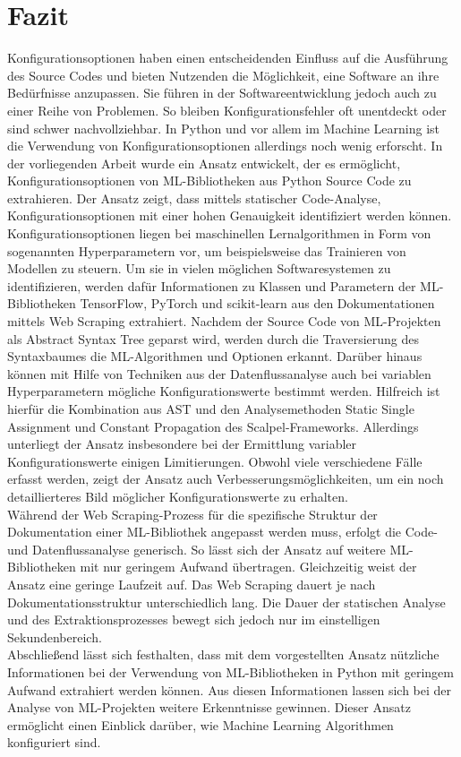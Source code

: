 \documentclass[german,bachelor]{swsLeipzig}
\begin{document}
\chapter{Fazit}\label{Fazit}
Konfigurationsoptionen haben einen entscheidenden Einfluss auf die Ausführung des Source Codes und bieten Nutzenden
die Möglichkeit, eine Software an ihre Bedürfnisse anzupassen.
Sie führen in der Softwareentwicklung jedoch auch zu einer Reihe von Problemen.
So bleiben Konfigurationsfehler oft unentdeckt oder sind schwer nachvollziehbar.
In Python und vor allem im Machine Learning ist die Verwendung von Konfigurationsoptionen allerdings noch wenig erforscht.
In der vorliegenden Arbeit wurde ein Ansatz entwickelt, der es ermöglicht, Konfigurationsoptionen von ML-Bibliotheken
aus Python Source Code zu extrahieren.
Der Ansatz zeigt, dass mittels statischer Code-Analyse, Konfigurationsoptionen mit einer hohen Genauigkeit identifiziert werden
können.\\
\indent Konfigurationsoptionen liegen bei maschinellen Lernalgorithmen in Form von sogenannten Hyperparametern vor, um beispielsweise
das Trainieren von Modellen zu steuern.
Um sie in vielen möglichen Softwaresystemen zu identifizieren, werden dafür Informationen zu Klassen und Parametern der
ML-Bibliotheken TensorFlow, PyTorch und scikit-learn aus den Dokumentationen mittels Web Scraping extrahiert.
Nachdem der Source Code von ML-Projekten als Abstract Syntax Tree geparst wird, werden durch die Traversierung des Syntaxbaumes
die ML-Algorithmen und Optionen erkannt.
Darüber hinaus können mit Hilfe von Techniken aus der Datenflussanalyse auch bei variablen Hyperparametern
mögliche Konfigurationswerte bestimmt werden.
Hilfreich ist hierfür die Kombination aus AST und den Analysemethoden Static Single Assignment und Constant Propagation
des Scalpel-Frameworks.
Allerdings unterliegt der Ansatz insbesondere bei der Ermittlung variabler Konfigurationswerte einigen Limitierungen.
Obwohl viele verschiedene Fälle erfasst werden, zeigt der Ansatz auch Verbesserungsmöglichkeiten, um ein noch
detaillierteres Bild möglicher Konfigurationswerte zu erhalten.\\
\indent Während der Web Scraping-Prozess für die spezifische Struktur der Dokumentation einer ML-Bibliothek angepasst werden muss,
erfolgt die Code- und Datenflussanalyse generisch.
So lässt sich der Ansatz auf weitere ML-Bibliotheken mit nur geringem Aufwand übertragen.
Gleichzeitig weist der Ansatz eine geringe Laufzeit auf.
Das Web Scraping dauert je nach Dokumentationsstruktur unterschiedlich lang.
Die Dauer der statischen Analyse und des Extraktionsprozesses bewegt sich jedoch nur im einstelligen Sekundenbereich.\\
\indent Abschließend lässt sich festhalten, dass mit dem vorgestellten Ansatz nützliche Informationen bei der Verwendung
von ML-Bibliotheken in Python mit geringem Aufwand extrahiert werden können.
Aus diesen Informationen lassen sich bei der Analyse von ML-Projekten weitere Erkenntnisse gewinnen.
Dieser Ansatz ermöglicht einen Einblick darüber, wie Machine Learning Algorithmen konfiguriert sind.
\end{document}
